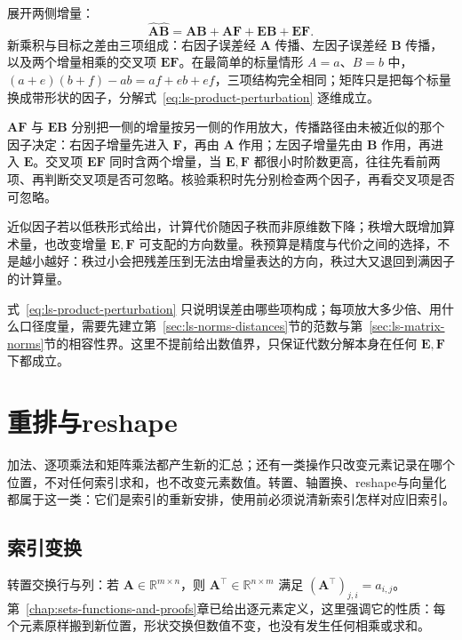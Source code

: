 展开两侧增量：
\begin{equation}
 \widehat{\bm A}\widehat{\bm B}
 =\bm A\bm B+\bm A\bm F+\bm E\bm B+\bm E\bm F.
 \label{eq:ls-product-perturbation}
\end{equation}
新乘积与目标之差由三项组成：右因子误差经 $\bm A$ 传播、左因子误差经 $\bm B$ 传播，以及两个增量相乘的交叉项 $\bm E\bm F$。在最简单的标量情形 $A=a$、$B=b$ 中，$(a+e)(b+f)-ab=af+eb+ef$，三项结构完全相同；矩阵只是把每个标量换成带形状的因子，分解式~\eqref{eq:ls-product-perturbation} 逐维成立。

$\bm A\bm F$ 与 $\bm E\bm B$ 分别把一侧的增量按另一侧的作用放大，传播路径由未被近似的那个因子决定：右因子增量先进入 $\bm F$，再由 $\bm A$ 作用；左因子增量先由 $\bm B$ 作用，再进入 $\bm E$。交叉项 $\bm E\bm F$ 同时含两个增量，当 $\bm E,\bm F$ 都很小时阶数更高，往往先看前两项、再判断交叉项是否可忽略。核验乘积时先分别检查两个因子，再看交叉项是否可忽略。

近似因子若以低秩形式给出，计算代价随因子秩而非原维数下降；秩增大既增加算术量，也改变增量 $\bm E,\bm F$ 可支配的方向数量。秩预算是精度与代价之间的选择，不是越小越好：秩过小会把残差压到无法由增量表达的方向，秩过大又退回到满因子的计算量。

式~\eqref{eq:ls-product-perturbation} 只说明误差由哪些项构成；每项放大多少倍、用什么口径度量，需要先建立第~\ref{sec:ls-norms-distances}节的范数与第~\ref{sec:ls-matrix-norms}节的相容性界。这里不提前给出数值界，只保证代数分解本身在任何 $\bm E,\bm F$ 下都成立。

\section{重排与reshape}
\label{sec:ls-reshaping}
\label{sec:linear-algebra-tensors-structured-operations}

加法、逐项乘法和矩阵乘法都产生新的汇总；还有一类操作只改变元素记录在哪个位置，不对任何索引求和，也不改变元素数值。转置、轴置换、reshape与向量化都属于这一类：它们是索引的重新安排，使用前必须说清新索引怎样对应旧索引。

\subsection{索引变换}

转置交换行与列：若 $\bm A\in\mathbb R^{m\times n}$，则 $\bm A^\top\in\mathbb R^{n\times m}$ 满足 $(\bm A^\top)_{j,i}=a_{i,j}$。第~\ref{chap:sets-functions-and-proofs}章已给出逐元素定义，这里强调它的性质：每个元素原样搬到新位置，形状交换但数值不变，也没有发生任何相乘或求和。

